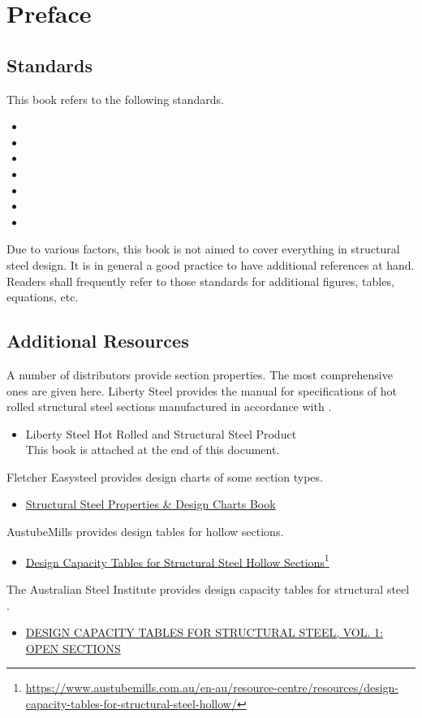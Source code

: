 \chapter{Preface}
\section{Standards}
This book refers to the following standards.
\begin{itemize}
\item \ASNZSACTION{}
\item \NZSSTEEL{}
\item \ASNZSSTEEL{}
\item \ASNZSPLATE{}
\item \ASNZSCOLD{}
\item \ASNZSWELD{}
\item \ANSI{}
\end{itemize}
Due to various factors, this book is not aimed to cover everything in structural steel design. It is in general a good practice to have additional references at hand. Readers shall frequently refer to those standards for additional figures, tables, equations, etc.
\section{Additional Resources}
A number of distributors provide section properties. The most comprehensive ones are given here. Liberty Steel provides the manual for specifications of hot rolled structural steel sections manufactured in accordance with \ASNZSSTEEL{}.
\begin{itemize}
\item Liberty Steel Hot Rolled and Structural Steel Product\\This book is attached at the end of this document.
\end{itemize}
Fletcher Easysteel provides design charts of some section types.
\begin{itemize}
\item \href{run:./REF/STRUCTURAL.STEEL.PROPERTIES.DESIGN.CHARTS.BOOK.pdf}{Structural Steel Properties \& Design Charts Book}
\end{itemize}
AustubeMills provides design tables for hollow sections.
\begin{itemize}
\item \href{https://www.austubemills.com.au/en-au/resource-centre/resources/design-capacity-tables-for-structural-steel-hollow/}{Design Capacity Tables for Structural Steel Hollow Sections}\footnote{\url{https://www.austubemills.com.au/en-au/resource-centre/resources/design-capacity-tables-for-structural-steel-hollow/}}
\end{itemize}
The Australian Steel Institute provides design capacity tables for structural steel \citep{ASI2016}.
\begin{itemize}
\item \href{https://www.steel.org.au/resources/bookshop/products/design-capacity-tables-for-structural-steel,-vol/}{DESIGN CAPACITY TABLES FOR STRUCTURAL STEEL, VOL. 1: OPEN SECTIONS}
\end{itemize}

